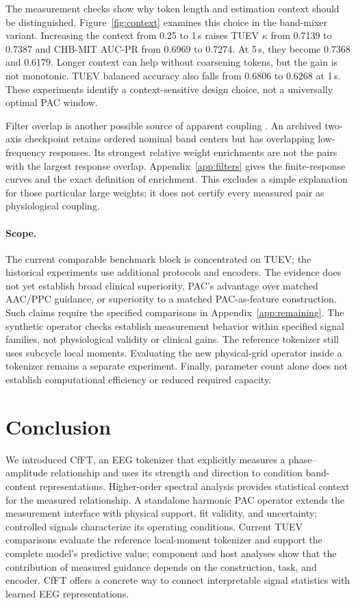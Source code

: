 \documentclass[10pt,twocolumn,letterpaper]{article}
\begin{document}
The measurement checks show why token length and estimation context
should be distinguished. Figure~\ref{fig:context} examines this choice
in the band-mixer variant. Increasing the context from
0.25 to 1\,s raises TUEV $\kappa$ from 0.7139 to 0.7387 and CHB-MIT
AUC-PR from 0.6969 to 0.7274. At 5\,s, they become 0.7368 and 0.6179.
Longer context can help without coarsening tokens, but the gain is not
monotonic. TUEV balanced accuracy also falls from 0.6806 to 0.6268
at 1\,s. These experiments identify a context-sensitive design choice,
not a universally optimal PAC window.

Filter overlap is another possible source of apparent coupling
\citep{aru2015untangling}. An archived two-axis checkpoint retains
ordered nominal band centers but has overlapping low-frequency
responses. Its strongest relative weight enrichments are not the pairs
with the largest response overlap. Appendix~\ref{app:filters} gives
the finite-response curves and the exact definition of enrichment.
This excludes a simple explanation for those particular large weights;
it does not certify every measured pair as physiological coupling.

\paragraph{Scope.}
The current comparable benchmark block is concentrated on TUEV;
the historical experiments use additional protocols and encoders.
The evidence does not yet establish broad clinical superiority,
PAC's advantage over matched AAC/PPC guidance, or superiority to a
matched PAC-as-feature construction. Such claims require the specified
comparisons in Appendix~\ref{app:remaining}.
The synthetic operator checks establish measurement behavior within
specified signal families, not physiological validity or clinical gains.
The reference tokenizer still uses subcycle local moments. Evaluating
the new physical-grid operator inside a tokenizer remains a separate
experiment. Finally, parameter count alone does not establish
computational efficiency or reduced required capacity.

\section{Conclusion}
\label{sec:conclusion}
We introduced CfFT, an EEG tokenizer that explicitly measures a
phase--amplitude relationship and uses its strength and direction to
condition band-content representations. Higher-order spectral analysis
provides statistical context for the measured relationship. A standalone
harmonic PAC operator extends the measurement interface with physical
support, fit validity, and uncertainty; controlled signals characterize
its operating conditions. Current TUEV comparisons evaluate the
reference local-moment tokenizer and support the complete model's predictive value;
component and host analyses show that the contribution of measured
guidance depends on the construction, task, and encoder. CfFT offers a
concrete way to connect interpretable signal statistics with learned
EEG representations.
\end{document}
